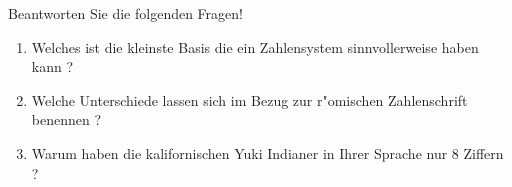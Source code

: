 \documentclass[a4paper,10pt]{article}
\begin{document}
Beantworten Sie die folgenden Fragen!

\begin{enumerate}
\item Welches ist die kleinste Basis die ein Zahlensystem sinnvollerweise haben kann ?   %
\item Welche Unterschiede lassen sich im Bezug zur r"omischen Zahlenschrift benennen ? %
\item Warum haben die kalifornischen Yuki Indianer in Ihrer Sprache nur 8 Ziffern ? %
\end{enumerate}
\end{document}

